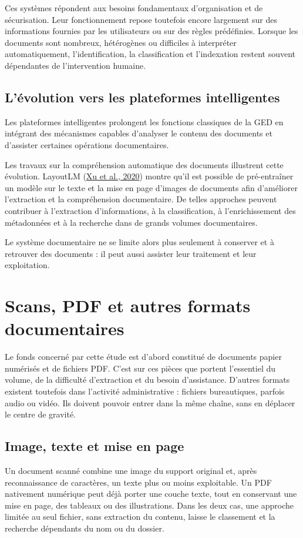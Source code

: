\documentclass[12pt,a4paper]{report}
\newcommand{\citer}[2]{\hyperref[ref:#1]{#2}}
\begin{document}
Ces systèmes répondent aux besoins fondamentaux d'organisation et de sécurisation. Leur fonctionnement repose toutefois encore largement sur des informations fournies par les utilisateurs ou sur des règles prédéfinies. Lorsque les documents sont nombreux, hétérogènes ou difficiles à interpréter automatiquement, l'identification, la classification et l'indexation restent souvent dépendantes de l'intervention humaine.

\subsection{L'évolution vers les plateformes intelligentes}
Les plateformes intelligentes prolongent les fonctions classiques de la GED en intégrant des mécanismes capables d'analyser le contenu des documents et d'assister certaines opérations documentaires.

Les travaux sur la compréhension automatique des documents illustrent cette évolution. LayoutLM (\citer{xu2020}{Xu et al., 2020}) montre qu'il est possible de pré-entraîner un modèle sur le texte et la mise en page d'images de documents afin d'améliorer l'extraction et la compréhension documentaire. De telles approches peuvent contribuer à l'extraction d'informations, à la classification, à l'enrichissement des métadonnées et à la recherche dans de grands volumes documentaires.

Le système documentaire ne se limite alors plus seulement à conserver et à retrouver des documents : il peut aussi assister leur traitement et leur exploitation.

\section{Scans, PDF et autres formats documentaires}
Le fonds concerné par cette étude est d'abord constitué de documents papier numérisés et de fichiers PDF. C'est sur ces pièces que portent l'essentiel du volume, de la difficulté d'extraction et du besoin d'assistance. D'autres formats existent toutefois dans l'activité administrative : fichiers bureautiques, parfois audio ou vidéo. Ils doivent pouvoir entrer dans la même chaîne, sans en déplacer le centre de gravité.

\subsection{Image, texte et mise en page}
Un document scanné combine une image du support original et, après reconnaissance de caractères, un texte plus ou moins exploitable. Un PDF nativement numérique peut déjà porter une couche texte, tout en conservant une mise en page, des tableaux ou des illustrations. Dans les deux cas, une approche limitée au seul fichier, sans extraction du contenu, laisse le classement et la recherche dépendants du nom ou du dossier.
\end{document}
